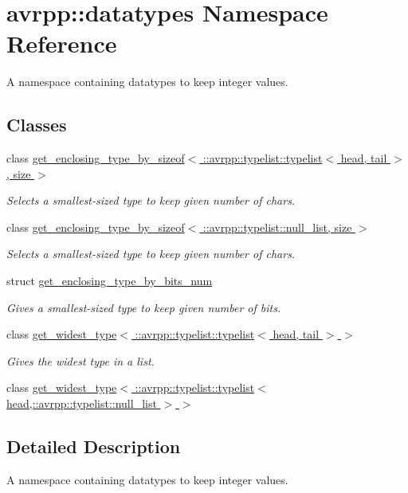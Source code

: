 \hypertarget{namespaceavrpp_1_1datatypes}{
\section{avrpp::datatypes Namespace Reference}
\label{namespaceavrpp_1_1datatypes}
}


A namespace containing datatypes to keep integer values.  


\subsection*{Classes}
\begin{DoxyCompactItemize}
\item 
class \hyperlink{classavrpp_1_1datatypes_1_1get__enclosing__type__by__sizeof_3_01_1_1avrpp_1_1typelist_1_1typelis9fc0eb4240be8e1020d3e8f1e14a8622}{get\_\-enclosing\_\-type\_\-by\_\-sizeof$<$ ::avrpp::typelist::typelist$<$ head, tail $>$, size $>$}
\begin{DoxyCompactList}\small\item\em Selects a smallest-\/sized type to keep given number of chars. \item\end{DoxyCompactList}\item 
class \hyperlink{classavrpp_1_1datatypes_1_1get__enclosing__type__by__sizeof_3_01_1_1avrpp_1_1typelist_1_1null__list_00_01size_01_4}{get\_\-enclosing\_\-type\_\-by\_\-sizeof$<$ ::avrpp::typelist::null\_\-list, size $>$}
\begin{DoxyCompactList}\small\item\em Selects a smallest-\/sized type to keep given number of chars. \item\end{DoxyCompactList}\item 
struct \hyperlink{structavrpp_1_1datatypes_1_1get__enclosing__type__by__bits__num}{get\_\-enclosing\_\-type\_\-by\_\-bits\_\-num}
\begin{DoxyCompactList}\small\item\em Gives a smallest-\/sized type to keep given number of bits. \item\end{DoxyCompactList}\item 
class \hyperlink{classavrpp_1_1datatypes_1_1get__widest__type_3_01_1_1avrpp_1_1typelist_1_1typelist_3_01head_00_01tail_01_4_01_4}{get\_\-widest\_\-type$<$ ::avrpp::typelist::typelist$<$ head, tail $>$ $>$}
\begin{DoxyCompactList}\small\item\em Gives the widest type in a list. \item\end{DoxyCompactList}\item 
class \hyperlink{classavrpp_1_1datatypes_1_1get__widest__type_3_01_1_1avrpp_1_1typelist_1_1typelist_3_01head_00_17d8c55404f4f223d4953ba4d90da08b2}{get\_\-widest\_\-type$<$ ::avrpp::typelist::typelist$<$ head,::avrpp::typelist::null\_\-list $>$ $>$}
\end{DoxyCompactItemize}


\subsection{Detailed Description}
A namespace containing datatypes to keep integer values. 
